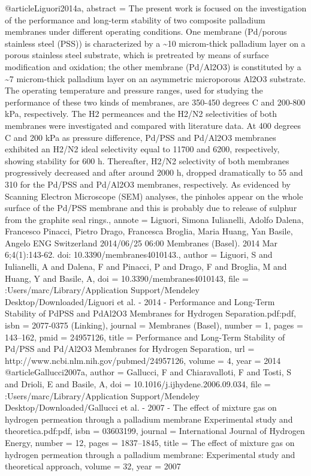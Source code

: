 @article{Liguori2014a,
abstract = {The present work is focused on the investigation of the performance and long-term stability of two composite palladium membranes under different operating conditions. One membrane (Pd/porous stainless steel (PSS)) is characterized by a {\~{}}10 microm-thick palladium layer on a porous stainless steel substrate, which is pretreated by means of surface modification and oxidation; the other membrane (Pd/Al2O3) is constituted by a {\~{}}7 microm-thick palladium layer on an asymmetric microporous Al2O3 substrate. The operating temperature and pressure ranges, used for studying the performance of these two kinds of membranes, are 350-450 degrees C and 200-800 kPa, respectively. The H2 permeances and the H2/N2 selectivities of both membranes were investigated and compared with literature data. At 400 degrees C and 200 kPa as pressure difference, Pd/PSS and Pd/Al2O3 membranes exhibited an H2/N2 ideal selectivity equal to 11700 and 6200, respectively, showing stability for 600 h. Thereafter, H2/N2 selectivity of both membranes progressively decreased and after around 2000 h, dropped dramatically to 55 and 310 for the Pd/PSS and Pd/Al2O3 membranes, respectively. As evidenced by Scanning Electron Microscope (SEM) analyses, the pinholes appear on the whole surface of the Pd/PSS membrane and this is probably due to release of sulphur from the graphite seal rings.},
annote = {Liguori, Simona
Iulianelli, Adolfo
Dalena, Francesco
Pinacci, Pietro
Drago, Francesca
Broglia, Maria
Huang, Yan
Basile, Angelo
ENG
Switzerland
2014/06/25 06:00
Membranes (Basel). 2014 Mar 6;4(1):143-62. doi: 10.3390/membranes4010143.},
author = {Liguori, S and Iulianelli, A and Dalena, F and Pinacci, P and Drago, F and Broglia, M and Huang, Y and Basile, A},
doi = {10.3390/membranes4010143},
file = {:Users/marc/Library/Application Support/Mendeley Desktop/Downloaded/Liguori et al. - 2014 - Performance and Long-Term Stability of PdPSS and PdAl2O3 Membranes for Hydrogen Separation.pdf:pdf},
isbn = {2077-0375 (Linking)},
journal = {Membranes (Basel)},
number = {1},
pages = {143--162},
pmid = {24957126},
title = {{Performance and Long-Term Stability of Pd/PSS and Pd/Al2O3 Membranes for Hydrogen Separation}},
url = {http://www.ncbi.nlm.nih.gov/pubmed/24957126},
volume = {4},
year = {2014}
}
@article{Gallucci2007a,
author = {Gallucci, F and Chiaravalloti, F and Tosti, S and Drioli, E and Basile, A},
doi = {10.1016/j.ijhydene.2006.09.034},
file = {:Users/marc/Library/Application Support/Mendeley Desktop/Downloaded/Gallucci et al. - 2007 - The effect of mixture gas on hydrogen permeation through a palladium membrane Experimental study and theoretica.pdf:pdf},
isbn = {03603199},
journal = {International Journal of Hydrogen Energy},
number = {12},
pages = {1837--1845},
title = {{The effect of mixture gas on hydrogen permeation through a palladium membrane: Experimental study and theoretical approach}},
volume = {32},
year = {2007}
}
